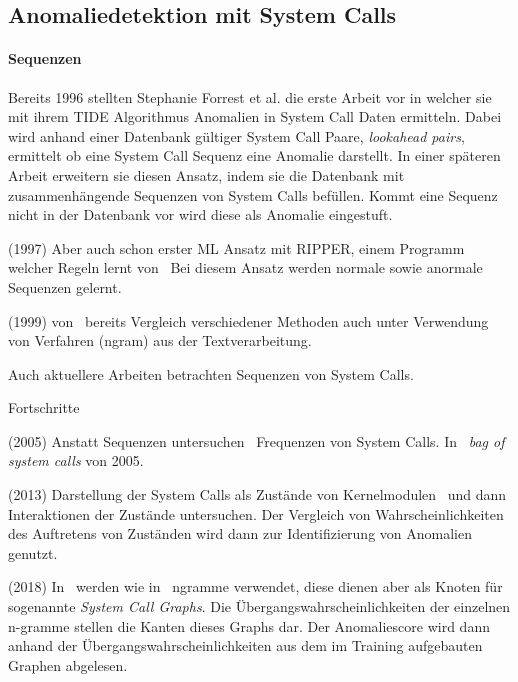     \subsection{Anomaliedetektion mit System Calls}

    \paragraph{Sequenzen}
        Bereits 1996 stellten Stephanie Forrest et al.\cite{FORREST} die erste Arbeit vor in welcher sie mit ihrem \ac{TIDE} Algorithmus Anomalien in System Call Daten ermitteln.
        Dabei wird anhand einer Datenbank gültiger System Call Paare, \textit{lookahead pairs}, ermittelt ob eine System Call Sequenz eine Anomalie darstellt.
        In einer späteren Arbeit erweitern sie diesen Ansatz, indem sie die Datenbank mit zusammenhängende Sequenzen von System Calls befüllen.
        Kommt eine Sequenz nicht in der Datenbank vor wird diese als Anomalie eingestuft.~\cite{STIDE}


        (1997) Aber auch schon erster \ac{ML} Ansatz mit RIPPER, einem Programm welcher Regeln lernt von~\cite{LEE1997}
        Bei diesem Ansatz werden normale sowie anormale Sequenzen gelernt.

        (1999) von~\cite{STIDE_Alternatives} bereits Vergleich verschiedener Methoden auch unter Verwendung von Verfahren (ngram) aus der Textverarbeitung.

Auch aktuellere Arbeiten betrachten Sequenzen von System Calls.

        Fortschritte 

        (2005) Anstatt Sequenzen untersuchen~\cite{FREQUENCY2} Frequenzen von System Calls.
        In~\cite{FREQUENCY2} \textit{bag of system calls} von 2005.

        (2013) Darstellung der System Calls als Zustände von Kernelmodulen~\cite{SYSTEM_STATES} und dann Interaktionen der Zustände untersuchen. 
        Der Vergleich von Wahrscheinlichkeiten des Auftretens von Zuständen wird dann zur Identifizierung von Anomalien genutzt.

        (2018) In~\cite{SYSCALL_GRAPHS} werden wie in~\cite{STIDE_Alternatives} ngramme verwendet, diese dienen aber als Knoten für sogenannte \textit{System Call Graphs}. 
        Die Übergangswahrscheinlichkeiten der einzelnen n-gramme stellen die Kanten dieses Graphs dar.
        Der Anomaliescore wird dann anhand der Übergangswahrscheinlichkeiten aus dem im Training aufgebauten Graphen abgelesen.


